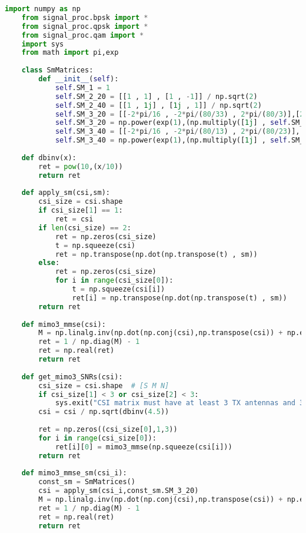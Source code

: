 \documentclass[UTF8]{article}
\begin{document}
\begin{lstlisting}[language=Python, caption=$ get\_SNRs.py $]
    import numpy as np
    from signal_proc.bpsk import *
    from signal_proc.qpsk import *
    from signal_proc.qam import *
    import sys
    from math import pi,exp
    
    class SmMatrices:
        def __init__(self):
            self.SM_1 = 1
            self.SM_2_20 = [[1 , 1] , [1 , -1]] / np.sqrt(2)
            self.SM_2_40 = [[1 , 1j] , [1j , 1]] / np.sqrt(2)
            self.SM_3_20 = [[-2*pi/16 , -2*pi/(80/33) , 2*pi/(80/3)],[2*pi/(80/23) , 2*pi/(48/13) , 2*pi/(240/13)],[-2*pi/(80/13) , 2*pi/(240/37) , 2*pi/(48/13)]]
            self.SM_3_20 = np.power(exp(1),(np.multiply([1j] , self.SM_3_20))).tolist() / np.sqrt(3)
            self.SM_3_40 = [[-2*pi/16 , -2*pi/(80/13) , 2*pi/(80/23)],[-2*pi/(80/37) , -2*pi/(48/11) , -2*pi/(240/107)],[2*pi/(80/7) , -2*pi/(240/83) , -2*pi/(48/11)]]
            self.SM_3_40 = np.power(exp(1),(np.multiply([1j] , self.SM_3_40))).tolist() / np.sqrt(3)
    
    def dbinv(x):
        ret = pow(10,(x/10))
        return ret
    
    def apply_sm(csi,sm):
        csi_size = csi.shape
        if csi_size[1] == 1:
            ret = csi
        if len(csi_size) == 2:
            ret = np.zeros(csi_size)
            t = np.squeeze(csi)
            ret = np.transpose(np.dot(np.transpose(t) , sm))
        else:
            ret = np.zeros(csi_size)
            for i in range(csi_size[0]):
                t = np.squeeze(csi[i])
                ret[i] = np.transpose(np.dot(np.transpose(t) , sm))        
        return ret
    
    def mimo3_mmse(csi):
        M = np.linalg.inv(np.dot(np.conj(csi),np.transpose(csi)) + np.eye(3))
        ret = 1 / np.diag(M) - 1
        ret = np.real(ret)
        return ret
    
    def get_mimo3_SNRs(csi):
        csi_size = csi.shape  # [S M N]
        if csi_size[1] < 3 or csi_size[2] < 3:
            sys.exit("CSI matrix must have at least 3 TX antennas and 3 RX antennas")
        csi = csi / np.sqrt(dbinv(4.5))
    
        ret = np.zeros((csi_size[0],1,3))
        for i in range(csi_size[0]):
            ret[i][0] = mimo3_mmse(np.squeeze(csi[i]))
        return ret
    
    def mimo3_mmse_sm(csi_i):
        const_sm = SmMatrices()
        csi = apply_sm(csi_i,const_sm.SM_3_20)
        M = np.linalg.inv(np.dot(np.conj(csi),np.transpose(csi)) + np.eye(3))
        ret = 1 / np.diag(M) - 1
        ret = np.real(ret)
        return ret
    

\end{lstlisting}
\end{document}
